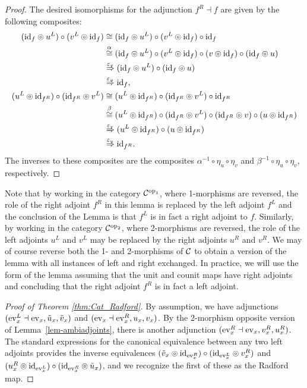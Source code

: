 \documentclass{amsart}
\begin{document}
\begin{proof}
The desired isomorphisms for the adjunction $f^R \dashv f$ are given by the following composites:
\begin{align*}
	(\mathrm{id}_{f} \circledcirc u^L) \circ (v^L \circledcirc \mathrm{id}_{f} )
		& \cong (\mathrm{id}_{f} \circledcirc u^L) \circ (v^L \circledcirc \mathrm{id}_{f} ) \circ \mathrm{id}_f\\
		& \stackrel{\alpha}{\cong} (\mathrm{id}_{f} \circledcirc u^L) \circ (v^L \circledcirc \mathrm{id}_{f} ) \circ (v \circledcirc \mathrm{id}_f) \circ (\mathrm{id}_f \circledcirc u) \\
		&  \stackrel{\varepsilon_v }{\Rightarrow} (\mathrm{id}_{f} \circledcirc u^L) \circ (\mathrm{id}_f \circledcirc u) \\
		& \stackrel{\varepsilon_u }{\Rightarrow} \mathrm{id}_{f},  \\
	(u^L \circledcirc \mathrm{id}_{f^R}) \circ (\mathrm{id}_{f^R} \circledcirc v^L) 
		& \cong  (u^L \circledcirc \mathrm{id}_{f^R}) \circ (\mathrm{id}_{f^R} \circledcirc v^L) \circ \mathrm{id}_{f^R} \\
		& \stackrel{\beta}{\cong}  (u^L \circledcirc \mathrm{id}_{f^R}) \circ (\mathrm{id}_{f^R} \circledcirc v^L) \circ (\mathrm{id}_{f^R} \circledcirc v) \circ (u \circledcirc \mathrm{id}_{f^R} ) \\
		& \stackrel{\varepsilon_v }{\Rightarrow} (u^L \circledcirc \mathrm{id}_{f^R}) \circ (u \circledcirc \mathrm{id}_{f^R} ) \\
		& \stackrel{\varepsilon_u }{\Rightarrow} \mathrm{id}_{f^R}.
\end{align*}
The inverses to these composites are the composites $\alpha^{-1} \circ \eta_u \circ \eta_v$ and $\beta^{-1} \circ \eta_u \circ \eta_v$, respectively.
\end{proof}

Note that by working in the category $\mathcal C^{\mathrm{op}_1}$, where 1-morphisms are reversed, the role of the right adjoint $f^R$ in this lemma is replaced by the left adjoint $f^L$ and the conclusion of the Lemma is that $f^L$ is in fact a right adjoint to $f$.  Similarly, by working in the category $\mathcal C^{\mathrm{op}_2}$, where 2-morphisms are reversed, the role of the left adjoints $u^L$ and $v^L$ may be replaced by the right adjoints $u^R$ and $v^R$.  We may of course reverse both the 1- and 2-morphisms of $\mathcal C$ to obtain a version of the lemma with all instances of left and right exchanged.  In practice, we will use the form of the lemma assuming that the unit and counit maps have right adjoints and concluding that the right adjoint $f^R$ is in fact a left adjoint.

\begin{proof}[Proof of Theorem \ref{thm:Cat_Radford}]
By assumption, we have adjunctions $(\mathrm{ev}_x^L \dashv \mathrm{ev}_x, \tilde{u}_x, \tilde{v}_x)$ and $(\mathrm{ev}_x \dashv \mathrm{ev}_x^R, u_x, v_x)$.  By the 2-morphism opposite version of Lemma~\ref{lem-ambiadjoints}, there is another adjunction $(\mathrm{ev}_x^R \dashv\mathrm{ev}_x,v_x^R,u_x^R)$.  The standard expressions for the canonical equivalence between any two left adjoints provides the inverse equivalences
$(\tilde{v}_x \circledcirc \mathrm{id}_{\mathrm{ev}_x^R})\circ (\mathrm{id}_{\mathrm{ev}_x^L} \circledcirc v_x^R)$
and
$(u_x^R \circledcirc \mathrm{id}_{\mathrm{ev}_x^L}) \circ (\mathrm{id}_{\mathrm{ev}_x^R} \circledcirc \tilde{u}_x)$, and we recognize the first of these as the Radford map.
\end{proof}
\end{document}
